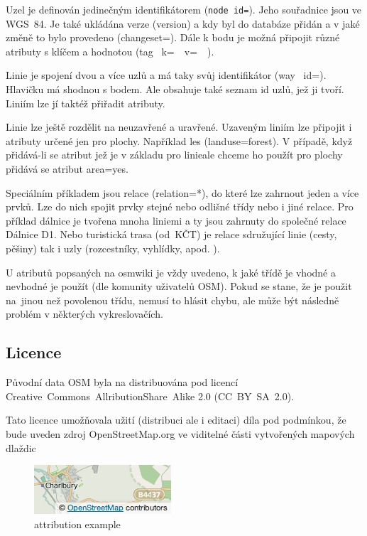 Uzel je definován jedinečným identifikátorem ({\tt node id=}). Jeho 
souřadnice jsou ve WGS~­84. Je také ukládána verze (version) a kdy 
byl do databáze přidán a v jaké změně to bylo provedeno (changeset=). 
Dále k bodu je možná připojit různé atributy s klíčem a hodnotou (tag~
k=~~v=~~). 

Linie je spojení dvou a více uzlů a má taky svůj identifikátor (way~
id=). Hlavičku má shodnou s bodem. Ale obsahuje také seznam id uzlů, 
jež ji tvoří. Liniím lze jí taktéž přiřadit atributy.  

Linie lze ještě rozdělit na neuzavřené a uravřené. Uzaveným liniím lze připojit 
i atributy určené jen pro plochy. Například les (landuse=forest).
V případě, když přidává-li se atribut jež je v základu pro linieale chceme ho použít pro plochy přidává se atribut area=yes.

Speciálním příkladem jsou relace (relation=*), do které lze zahrnout 
jeden a více prvků. Lze do nich spojit prvky stejné nebo odlišné třídy 
nebo i jiné relace. Pro příklad dálnice je tvořena mnoha liniemi a ty 
jsou zahrnuty do společné relace Dálnice D1. Nebo turistická trasa 
(od~KČT) je relace sdružující linie (cesty, pěšiny) tak i uzly 
(rozcestníky, vyhlídky, apod. ).

U atributů popsaných na osmwiki je vždy uvedeno, k jaké třídě je 
vhodné a nevhodné je použít (dle komunity uživatelů OSM). Pokud se stane, že je použit 
na~jinou než povolenou třídu, nemusí to hlásit chybu, ale může být následně 
problém v některých vykreslovačích. \cite{OSMfeatures}

\subsection{Licence}
\label{licence}

Původní data OSM byla na distribuována pod licencí 
Creative~Commons~Allribution­Share~Alike 2.0 (CC~BY~­SA~2.0). 


Tato licence umožňovala užití (distribuci ale i editaci) díla pod podmínkou, 
že bude uveden zdroj OpenStreetMap.org ve viditelné části 
vytvořených mapových dlaždic \cite{OSMlicence} 

  \begin{figure}[hbt]
    \centering
      \includegraphics{./pictures/attribution_example.png}
      \caption{attribution example}
      \label{fig:attribution_example}
  \end{figure} 

